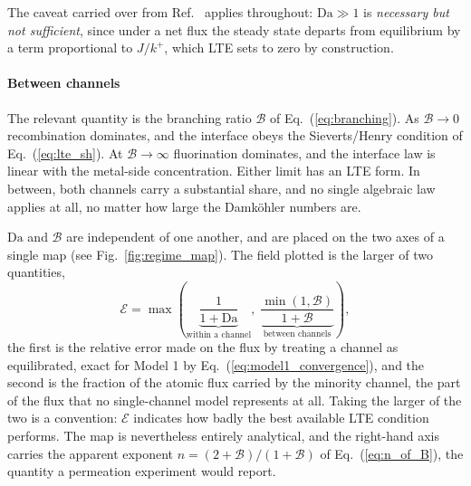 \documentclass[5p]{elsarticle}
\newcommand{\Da}{\mathrm{Da}}
\newcommand{\Bra}{\mathcal{B}}             %
\begin{document}
The caveat carried over from Ref.~\cite{silva-solis_hydrogen_2026} applies throughout: $\Da \gg 1$ is \emph{necessary but not sufficient}, since under a net flux the steady state departs from equilibrium by a term proportional to $J/k^{+}$, which LTE sets to zero by construction.


\paragraph{Between channels}
The relevant quantity is the branching ratio $\Bra$ of Eq.~(\ref{eq:branching}).
As $\Bra \rightarrow 0$ recombination dominates, and the interface obeys the Sieverts/Henry condition of Eq.~(\ref{eq:lte_sh}).
At $\Bra \rightarrow \infty$ fluorination dominates, and the interface law is linear with the metal-side concentration.
Either limit has an LTE form.
In between, both channels carry a substantial share, and no single algebraic law applies at all, no matter how large the Damk\"ohler numbers are.

$\Da$ and $\Bra$ are independent of one another, and are placed on the two axes of a single map (see Fig.~\ref{fig:regime_map}).
The field plotted is the larger of two quantities,
\begin{equation}
    \mathcal{E} = \max\left(
        \underbrace{\frac{1}{1 + \Da}}_{\text{within a channel}} ,\;
        \underbrace{\frac{\min(1, \Bra)}{1 + \Bra}}_{\text{between channels}}
    \right),
    \label{eq:lte_indicator}
\end{equation}
the first is the relative error made on the flux by treating a channel as equilibrated, exact for Model 1 by Eq.~(\ref{eq:model1_convergence}), and the second is the fraction of the atomic flux carried by the minority channel, the part of the flux that no single-channel model represents at all.
Taking the larger of the two is a convention: $\mathcal{E}$ indicates how badly the best available LTE condition performs.
The map is nevertheless entirely analytical, and the right-hand axis carries the apparent exponent $n = (2+\Bra)/(1+\Bra)$ of Eq.~(\ref{eq:n_of_B}), the quantity a permeation experiment would report.
\end{document}

